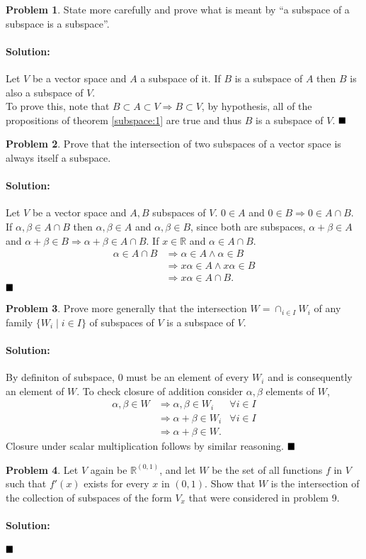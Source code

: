 \documentclass[]{article}
\newcommand{\RR}{\mathbb{R}}
\theoremstyle{definition}
\newtheorem{problem}{Problem}
\newenvironment{solution}{\paragraph{Solution:}}{\hfill$\blacksquare \\$}
\begin{document}
\begin{problem}
State more carefully and prove what is meant by ``a subspace of a subspace is a subspace''.	
\end{problem}
\begin{solution}
	Let $V$ be a vector space and $A$ a subspace of it. If $B$ is a subspace of $A$ then $B$ is also a subspace of $V$.
	\\
	To prove this, note that $B \subset A \subset V \Rightarrow B \subset V$, by hypothesis, all of the propositions of theorem \ref{subspace:1} are true and thus $B$ is a subspace of $V$.
\end{solution}
\begin{problem}
Prove that the intersection of two subspaces of a vector space is always itself a subspace.	
\end{problem}
\begin{solution}
Let $V$ be a vector space and $A,B$ subspaces of $V$. $0 \in A$ and $0 \in B \Rightarrow 0 \in A \cap B$. If $\alpha,\beta \in A \cap B$ then $\alpha,\beta \in A$ and $\alpha, \beta \in B$, since both are subspaces, $\alpha+\beta \in A$ and $\alpha + \beta \in B \Rightarrow \alpha+\beta \in A \cap B$. If $x \in \RR$ and $\alpha \in A \cap B$.
\begin{align*}
\alpha \in A \cap B & \Rightarrow \alpha \in A \wedge \alpha \in B \\
& \Rightarrow x\alpha \in A \wedge x\alpha \in B \\
& \Rightarrow x\alpha \in A \cap B.
\end{align*} 
\end{solution}
\begin{problem}
Prove more generally that the intersection $W = \cap_{i\in I} W_i$ of any family $\{W_i \mid i \in I \}$ of subspaces of $V$ is a subspace of $V$.
\end{problem}
\begin{solution}
	By definiton of subspace, $0$ must be an element of every $W_i$ and is consequently an element of $W$. To check closure of addition consider $\alpha, \beta$ elements of $W$,
	\begin{align*}
	\alpha, \beta \in W & \Rightarrow \alpha, \beta \in W_i & \forall i \in I \\
	& \Rightarrow \alpha + \beta \in W_i & \forall i \in I \\
	& \Rightarrow \alpha + \beta \in W.
	\end{align*}
	Closure under scalar multiplication follows by similar reasoning. 
\end{solution}
\begin{problem}
Let $V$ again be $\RR^{(0,1)}$, and let $W$ be the set of all functions $f$ in $V$ such that $f'(x)$ exists for every $x$ in $(0,1)$. Show that $W$ is the intersection of the collection of subspaces of the form $V_x$ that were considered in problem 9.	
\end{problem}
\begin{solution}
	
\end{solution}
\end{document}
